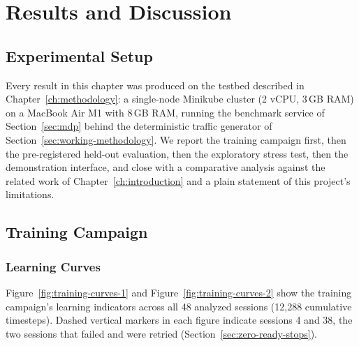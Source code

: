 \chapter{Results and Discussion}
\label{ch:results}

\section{Experimental Setup}
\label{sec:results-setup}

Every result in this chapter was produced on the testbed described in
Chapter~\ref{ch:methodology}: a single-node Minikube cluster (2 vCPU,
3\,GB RAM) on a MacBook Air M1 with 8\,GB RAM, running the benchmark
service of Section~\ref{sec:mdp} behind the deterministic traffic
generator of Section~\ref{sec:working-methodology}. We report the training
campaign first, then the pre-registered held-out evaluation, then the
exploratory stress test, then the demonstration interface, and close with
a comparative analysis against the related work of Chapter~\ref{ch:introduction}
and a plain statement of this project's limitations.

\section{Training Campaign}
\label{sec:training-campaign}

\subsection{Learning Curves}

Figure~\ref{fig:training-curves-1} and Figure~\ref{fig:training-curves-2}
show the training campaign's learning indicators across all 48 analyzed
sessions (12,288 cumulative timesteps). Dashed vertical markers in each
figure indicate sessions 4 and 38, the two sessions that failed and were
retried (Section~\ref{sec:zero-ready-stops}).

